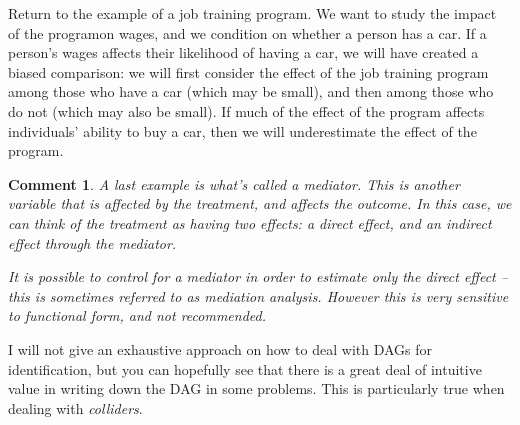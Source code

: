 \documentclass{tufte-handout}
\theoremstyle{break}
\newtheorem{cmt}{Comment}
\newcommand{\continuation}{??}
\newenvironment{continueexample}[1]
 {\renewcommand{\continuation}{\ref{#1}}\excont[continued]}
 {\endexcont}
\begin{document}
\begin{boxD}
\begin{continueexample}{ex:example2}
  Return to the example of a job training program. We want to study the impact of the programon wages, and we condition on whether a person has a car. If a person's wages affects their likelihood of having a car, we will have created a biased comparison: we will first consider the effect of the job training program among those who have a car (which may be small), and then among those who do not (which may also be small). If much of the effect of the program affects individuals' ability to buy a car, then we will underestimate the effect of the program.
\end{continueexample}
\end{boxD}
 
\begin{boxF}
  \begin{cmt}
    A last example is what's called a \emph{mediator}. This is another variable that is affected by the treatment, and affects the outcome. In this case, we can think of the treatment as having two effects: a direct effect, and an indirect effect through the mediator. 

    \centering  {}

\raggedright
    It is possible to control for a mediator in order to estimate only the direct effect -- this is sometimes referred to as mediation analysis. However this is \emph{very} sensitive to functional form, and not recommended.
  \end{cmt}
\end{boxF}

I will not give an exhaustive approach on how to deal with DAGs for identification, but you can hopefully see that there is a great deal of intuitive value in writing down the DAG in some problems. This is particularly true when dealing with \emph{colliders}. 
\end{document}
